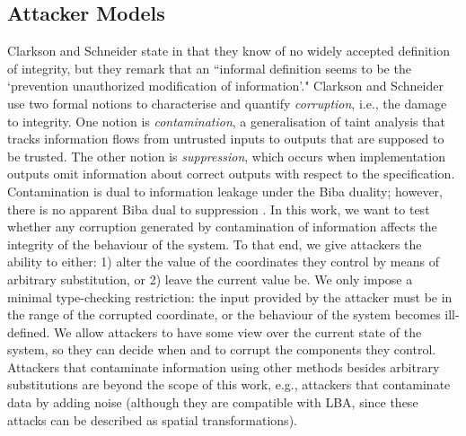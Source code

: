 {\subsection{Attacker Models} 
Clarkson and Schneider state in \cite{QuantitativeIntegrity} that they know of no widely accepted definition of integrity, but they remark that an ``informal definition seems to be the `prevention unauthorized modification of information'." Clarkson and Schneider use two formal notions to characterise and quantify \emph{corruption}, i.e., the damage to integrity. One notion is \emph{contamination}, a generalisation of taint analysis that tracks information flows from untrusted inputs to outputs that are supposed to be trusted. The other notion is \emph{suppression}, which occurs when implementation outputs omit information about correct outputs with respect to the specification. Contamination is dual to information leakage under the Biba duality; however, there is no apparent Biba dual to suppression \cite{BibaIntegrity}. 
In this work, we want to test whether any corruption generated by contamination of information affects the integrity of the behaviour of the system. To that end, we %
give attackers the ability to either: 1) alter the value of the coordinates they control by means of arbitrary substitution, or 2) leave the current value be. We only impose a minimal type-checking restriction: the input provided by the attacker must be in the range of the corrupted coordinate, or the behaviour of the system becomes ill-defined. We allow attackers to have some view over the current state of the system, so they can decide when and to corrupt the components they control. Attackers that contaminate information using other methods besides arbitrary substitutions are beyond the scope of this work, e.g., attackers that contaminate data by adding noise (although they are compatible with LBA, since these attacks can be described as spatial transformations).  



}
